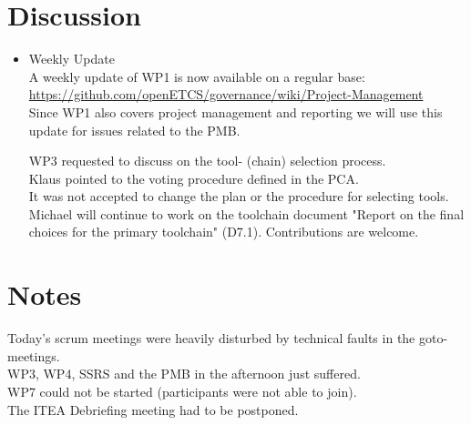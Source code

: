 \documentclass[a4paper, 11pt]{article}
\begin{document}
\section{Discussion}
\begin{itemize}
\item Weekly Update\\
A weekly update of WP1 is now available on a regular base: \url{https://github.com/openETCS/governance/wiki/Project-Management}\\
Since WP1 also covers project management and reporting we will use this update for issues related to the PMB. 

WP3 requested to discuss on the tool- (chain) selection process.\\
Klaus pointed to the voting procedure defined in the PCA.\\
It was not accepted to change the plan or the procedure for selecting tools. Michael will continue to work on the toolchain document "Report on the final choices for the primary toolchain" (D7.1). Contributions are welcome.\\

\end{itemize}

\section{Notes}
Today's scrum meetings were heavily disturbed by technical faults in the goto-meetings.\\
WP3, WP4, SSRS and the PMB in the afternoon just suffered.\\
WP7 could not be started (participants were not able to join).\\
The ITEA Debriefing meeting had to be postponed.
\end{document}
